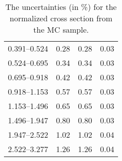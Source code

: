 \begin{table}
\begin{center}
\begin{tabular}{@{}l l l l@{}}
            0.391--0.524 & 0.28 & 0.28 & 0.03  \\
            0.524--0.695 & 0.34 & 0.34 & 0.03  \\
            0.695--0.918 & 0.42 & 0.42 & 0.03  \\
            0.918--1.153 & 0.57 & 0.57 & 0.03  \\
            1.153--1.496 & 0.65 & 0.65 & 0.03  \\
            1.496--1.947 & 0.80 & 0.80 & 0.03  \\
            1.947--2.522 & 1.02 & 1.02 & 0.04  \\
            2.522--3.277 & 1.26 & 1.26 & 0.04  \\
            \bottomrule
        \end{tabular}
    \end{center}
    \caption[
        The uncertainties for the normalized cross section from the \MADGRAPH
        MC sample.
    ]{
        The uncertainties (in \%) for the normalized cross section from the
        \MADGRAPH MC sample.
    }
    \label{tab:madgraph_uncert_norm}
\end{table}

